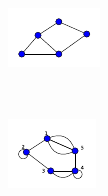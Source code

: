 \documentclass[10pt,a4paper]{article}
\theoremstyle{plain}
\theoremstyle{definition}
\begin{document}
\begin{figure}[!h]
	\centering
	\begin{subfigure}[b]{0.24\textwidth}
		\includegraphics[width=\textwidth]{images/simple-graph.pdf}
		\caption{}
		\label{simplegraph}
	\end{subfigure}
	~
	\begin{subfigure}[b]{0.24\textwidth}
		\includegraphics[width=\textwidth]{images/multi-graph.pdf}
		\caption{}
		\label{multigraph}
	\end{subfigure}
	~
	\begin{subfigure}[b]{0.22\textwidth}

\end{subfigure}
\end{figure}
\end{document}
